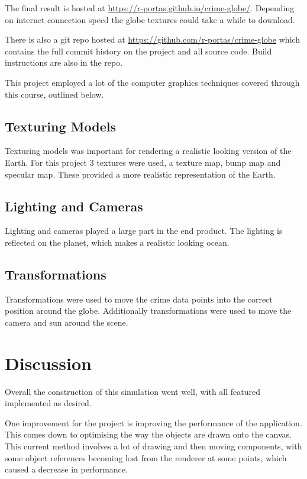 \documentclass[]{article}
\begin{document}
The final result is hosted at \url{https://r-portas.github.io/crime-globe/}.
Depending on internet connection speed the globe textures could take a while to download.

There is also a git repo hosted at \url{https://github.com/r-portas/crime-globe} which contains the
full commit history on the project and all source code.
Build instructions are also in the repo.

This project employed a lot of the computer graphics techniques covered through this course, outlined below.

\subsection{Texturing Models}

Texturing models was important for rendering a realistic looking version of the Earth.
For this project 3 textures were used, a texture map, bump map and specular map.
These provided a more realistic representation of the Earth.

\subsection{Lighting and Cameras}

Lighting and cameras played a large part in the end product.
The lighting is reflected on the planet, which makes a realistic looking ocean.

\subsection{Transformations}

Transformations were used to move the crime data points into the correct position around the globe.
Additionally transformations were used to move the camera and sun around the scene.

\section{Discussion}

Overall the construction of this simulation went well,
with all featured implemented as desired.

One improvement for the project is improving the performance of the application.
This comes down to optimising the way the objects are drawn onto the canvas.
This current method involves a lot of drawing and then moving components, with
some object references becoming lost from the renderer at some points, which
caused a decrease in performance.
\end{document}
